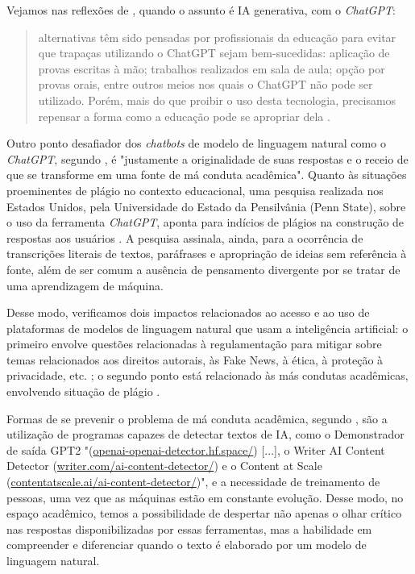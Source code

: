 \documentclass[portuguese]{textolivre}
\begin{document}
Vejamos nas reflexões de \textcite{demoraes2023}, quando o assunto é IA generativa, com o \emph{ChatGPT}:

\begin{quote}
    alternativas têm sido pensadas por profissionais da educação para evitar que trapaças utilizando o ChatGPT sejam bem-sucedidas: aplicação de provas escritas à mão; trabalhos realizados em sala de aula; opção por provas orais, entre outros meios nos quais o ChatGPT não pode ser utilizado. Porém, mais do que proibir o uso desta tecnologia, precisamos repensar a forma como a educação pode se apropriar dela \cite[p. 4]{demoraes2023}.
\end{quote}

Outro ponto desafiador dos \emph{chatbots} de modelo de linguagem natural como o \emph{ChatGPT}, segundo \textcite[p. 40]{marques2023}, é "justamente a originalidade de suas respostas e o receio de que se transforme em uma fonte de má conduta acadêmica". Quanto às situações proeminentes de plágio no contexto educacional, uma pesquisa realizada nos Estados Unidos, pela Universidade do Estado da Pensilvânia (Penn State), sobre o uso da ferramenta \emph{ChatGPT}, aponta para indícios de plágios na construção de respostas aos usuários \cite{demoraes2023}. A pesquisa assinala, ainda, para a ocorrência de transcrições literais de textos, paráfrases e apropriação de ideias sem referência à fonte, além de ser comum a ausência de pensamento divergente \cite{santaella2023inteligencia} por se tratar de uma aprendizagem de máquina.

Desse modo, verificamos dois impactos relacionados ao acesso e ao uso de plataformas de modelos de linguagem natural que usam a inteligência artificial: o primeiro envolve questões relacionadas à regulamentação para mitigar sobre temas relacionados aos direitos autorais, às Fake News, à ética, à proteção à privacidade, etc. \cite{coeckelbergh2020ai, kaufman2021, 2022kaufman}; o segundo ponto está relacionado às más condutas acadêmicas, envolvendo situação de plágio \cite{marques2023, demoraes2023}.

Formas de se prevenir o problema de má conduta acadêmica, segundo \textcite[p. 40]{marques2023}, são a utilização de programas capazes de detectar textos de IA, como o Demonstrador de saída GPT2 "(\url{openai-openai-detector.hf.space/}) [...], o Writer AI Content Detector (\url{writer.com/ai-content-detector/}) e o Content at Scale (\url{contentatscale.ai/ai-content-detector/})", e a necessidade de treinamento de pessoas, uma vez que as máquinas estão em constante evolução. Desse modo, no espaço acadêmico, temos a possibilidade de despertar não apenas o olhar crítico nas respostas disponibilizadas por essas ferramentas, mas a habilidade em compreender e diferenciar quando o texto é elaborado por um modelo de linguagem natural. 
\end{document}
